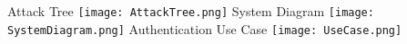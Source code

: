 \documentclass{article}
\begin{document}
Attack Tree \newline
\texttt{[image: AttackTree.png]}\newline
System Diagram \newline
\texttt{[image: SystemDiagram.png]}\newline
Authentication Use Case \newline
\texttt{[image: UseCase.png]}
\end{document}

